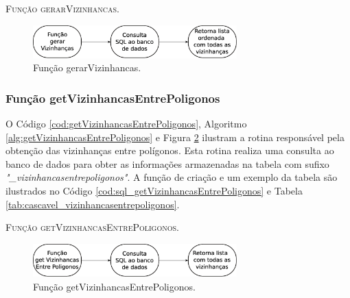 

\begin{algorithm}[H]
   \SetAlgoLined   
   
   \caption{\textsc{Função gerarVizinhancas.}}
   \label{alg:gerarVizinhancas}
\end{algorithm}

\begin{figure}[H]
  \centering
  \includegraphics[width=0.7\textwidth]{Figuras/Simula/Fluxos/gerarVizinhancas.eps}
  \caption{Função gerarVizinhancas.}
  \label{fig:gerarVizinhancas}
\end{figure} 

\newpage

\subsubsection{Função getVizinhancasEntrePoligonos}

O Código \ref{cod:getVizinhancasEntrePoligonos}, Algoritmo \ref{alg:getVizinhancasEntrePoligonos} e Figura \ref{fig:getVizinhancasEntrePoligonos} ilustram a rotina responsável pela obtenção das vizinhanças entre polígonos. Esta rotina realiza uma consulta ao banco de dados para obter as informações armazenadas na tabela com sufixo \textit{"\_vizinhancasentrepoligonos"}. A função de criação e um exemplo da tabela são ilustrados no Código \ref{cod:sql_getVizinhancasEntrePoligonos} e Tabela \ref{tab:cascavel_vizinhancasentrepoligonos}. 



\begin{algorithm}[H]
   \SetAlgoLined   
   
   \caption{\textsc{Função getVizinhancasEntrePoligonos.}}
   \label{alg:getVizinhancasEntrePoligonos}
\end{algorithm}

\begin{figure}[H]
  \centering
  \includegraphics[width=0.7\textwidth]{Figuras/Simula/Fluxos/getVizinhancasEntrePoligonos.eps}
  \caption{Função getVizinhancasEntrePoligonos.}
  \label{fig:getVizinhancasEntrePoligonos}
\end{figure} 

